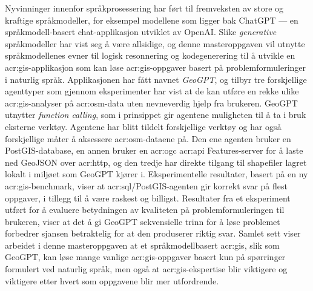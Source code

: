 Nyvinninger innenfor språkprosessering har ført til fremveksten av store og kraftige språkmodeller, for eksempel modellene som ligger bak ChatGPT --- en språkmodell-basert chat-applikasjon utviklet av OpenAI. Slike \textit{generative} språkmodeller har vist seg å være allsidige, og denne masteroppgaven vil utnytte språkmodellenes evner til logisk resonnering og kodegenerering til å utvikle en \acrshort{acr:gis}-applikasjon som kan løse \acrshort{acr:gis}-oppgaver basert på problemformuleringer i naturlig språk. Applikasjonen har fått navnet \textit{GeoGPT}, og tilbyr tre forskjellige agenttyper som gjennom eksperimenter har vist at de kan utføre en rekke ulike \acrshort{acr:gis}-analyser på \gls{acr:osm}-data uten nevneverdig hjelp fra brukeren. GeoGPT utnytter \textit{function calling}, som i prinsippet gir agentene muligheten til å ta i bruk eksterne verktøy. Agentene har blitt tildelt forskjellige verktøy og har også forskjellige måter å aksessere \gls{acr:osm}-dataene på. Den ene agenten bruker en PostGIS-database, en annen bruker en \acrshort{acr:ogc} \acrshort{acr:api} Features-server for å laste ned GeoJSON over \acrshort{acr:http}, og den tredje har direkte tilgang til shapefiler lagret lokalt i miljøet som GeoGPT kjører i. Eksperimentelle resultater, basert på en ny \acrshort{acr:gis}-benchmark, viser at \acrshort{acr:sql}/PostGIS-agenten gir korrekt svar på flest oppgaver, i tillegg til å være raskest og billigst. Resultater fra et eksperiment utført for å evaluere betydningen av kvaliteten på problemformuleringen til brukeren, viser at det å gi GeoGPT sekvensielle trinn for å løse problemet forbedrer sjansen betraktelig for at den produserer riktig svar. Samlet sett viser arbeidet i denne masteroppgaven at et språkmodellbasert \acrshort{acr:gis}, slik som GeoGPT, kan løse mange vanlige \acrshort{acr:gis}-oppgaver basert kun på spørringer formulert ved naturlig språk, men også at \acrshort{acr:gis}-ekspertise blir viktigere og viktigere etter hvert som oppgavene blir mer utfordrende.


